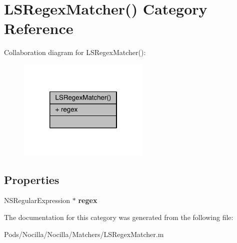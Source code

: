 \hypertarget{category_l_s_regex_matcher_07_08}{\section{L\-S\-Regex\-Matcher() Category Reference}
\label{category_l_s_regex_matcher_07_08}
}


Collaboration diagram for L\-S\-Regex\-Matcher()\-:\nopagebreak
\begin{figure}[H]
\begin{center}
\leavevmode
\includegraphics[width=178pt]{category_l_s_regex_matcher_07_08__coll__graph}
\end{center}
\end{figure}
\subsection*{Properties}
\begin{DoxyCompactItemize}
\item 
\hypertarget{category_l_s_regex_matcher_07_08_a62cb71e7f4dcf069cd80e92facfa472d}{N\-S\-Regular\-Expression $\ast$ {\bfseries regex}}\label{category_l_s_regex_matcher_07_08_a62cb71e7f4dcf069cd80e92facfa472d}

\end{DoxyCompactItemize}


The documentation for this category was generated from the following file\-:\begin{DoxyCompactItemize}
\item 
Pods/\-Nocilla/\-Nocilla/\-Matchers/L\-S\-Regex\-Matcher.\-m\end{DoxyCompactItemize}
